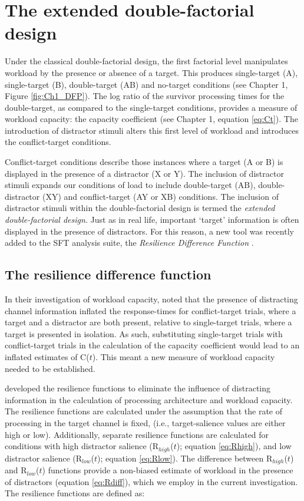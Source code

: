 \section{The extended double-factorial design}
Under the classical double-factorial design, the first factorial level manipulates workload by the presence or absence of a target. This produces single-target (A), single-target (B), double-target (AB) and no-target conditions (see Chapter 1, Figure \ref{fig:Ch1_DFP}). The log ratio of the survivor processing times for the double-target, as compared to the single-target conditions, provides a measure of workload capacity: the capacity coefficient (see Chapter 1, equation \ref{eq:Ct}). The introduction of distractor stimuli alters this first level of workload and introduces the conflict-target conditions.

Conflict-target conditions describe those instances where a target (A or B) is displayed in the presence of a distractor (X or Y). The inclusion of distractor stimuli expands our conditions of load to include double-target (AB), double-distractor (XY) and conflict-target (AY or XB) conditions. The inclusion of distractor stimuli within the double-factorial design is termed the \emph{extended double-factorial design}. Just as in real life, important `target' information is often displayed in the presence of distractors. For this reason, a new tool was recently added to the SFT analysis suite, the \emph{Resilience Difference Function} \cite{little2015resilience}.

\subsection{The resilience difference function}
In their investigation of workload capacity, \citeauthor{little2015resilience} \citeyear{little2015resilience} noted that the presence of distracting channel information inflated the response-times for conflict-target trials, where a target and a distractor are both present, relative to single-target trials, where a target is presented in isolation. As such, substituting single-target trials with conflict-target trials in the calculation of the capacity coefficient would lead to an inflated estimates of C($t$). This meant a new measure of workload capacity needed to be established.

\citeauthor{little2015resilience} developed the resilience functions to eliminate the influence of distracting information in the calculation of processing architecture and workload capacity. The resilience functions are calculated under the assumption that the rate of processing in the target channel is fixed, (i.e., target-salience values are either high or low). Additionally, separate resilience functions are calculated for conditions with high distractor salience (R$_{high}$($t$); equation \ref{eq:Rhigh}), and low distractor salience (R$_{low}$($t$); equation \ref{eq:Rlow}). The difference between R$_{high}$($t$) and R$_{low}$($t$) functions provide a non-biased estimate of workload in the presence of distractors (equation \ref{eq:Rdiff}), which we employ in the current investigation. The resilience functions are defined as: 

